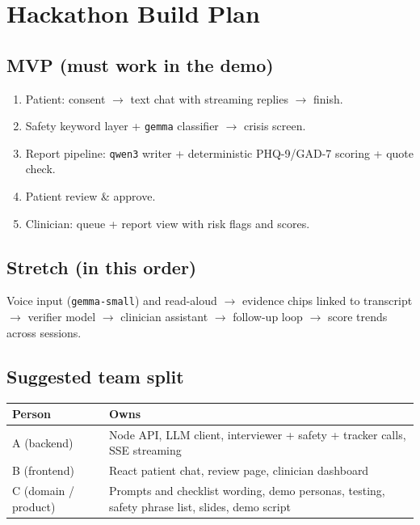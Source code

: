 \documentclass[11pt]{article}
\newcommand{\model}[1]{\texttt{\textcolor{model}{#1}}}
\begin{document}
\section{Hackathon Build Plan}

\subsection{MVP (must work in the demo)}
\begin{enumerate}
  \item Patient: consent $\rightarrow$ text chat with streaming replies $\rightarrow$ finish.
  \item Safety keyword layer + \model{gemma} classifier $\rightarrow$ crisis screen.
  \item Report pipeline: \model{qwen3} writer + deterministic PHQ-9/GAD-7 scoring + quote check.
  \item Patient review \& approve.
  \item Clinician: queue + report view with risk flags and scores.
\end{enumerate}

\subsection{Stretch (in this order)}
Voice input (\model{gemma-small}) and read-aloud $\rightarrow$ evidence chips linked to transcript $\rightarrow$ verifier model $\rightarrow$
clinician assistant $\rightarrow$ follow-up loop $\rightarrow$ score trends across sessions.

\subsection{Suggested team split}
\begin{tabularx}{\textwidth}{@{}l X@{}}
\toprule
\textbf{Person} & \textbf{Owns} \\
\midrule
A (backend) & Node API, LLM client, interviewer + safety + tracker calls, SSE streaming \\
B (frontend) & React patient chat, review page, clinician dashboard \\
C (domain / product) & Prompts and checklist wording, demo personas, testing, safety phrase list, slides, demo script \\
\bottomrule
\end{tabularx}
\end{document}
